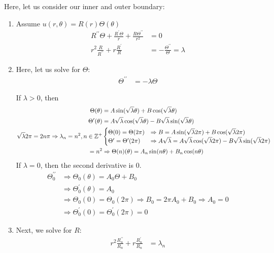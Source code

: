 Here, let us consider our inner and outer boundary:
%
\begin{enumerate}
  \item Assume $u(r, \theta) = R(r)\Theta(\theta)$
  \begin{align}
    R^{\prime\prime} \Theta + \frac{R^\prime \Theta}{r} + \frac{R\Theta^{\prime\prime}}{r^2} & = 0\\
    r^2 \frac{R}{R^{\prime\prime}} + r \frac{R^\prime}{R} & = - \frac{\Theta^{\prime\prime}}{\Theta} = \lambda
  \end{align}
  \item Here, let us solve for $\Theta$:
  \begin{align}
    \Theta^{\prime\prime} & = - \lambda \Theta
  \end{align}

  If $\lambda > 0$, then
  \begin{align}
    \Theta(\theta) & =
    A \sin(\sqrt \lambda \theta) + B \cos(\sqrt \lambda \theta)\\
    \Theta^\prime(\theta) & =
    A \sqrt \lambda \cos ( \sqrt \lambda \theta) - B \sqrt \lambda \sin (\sqrt \lambda \theta)\\
    \sqrt \lambda 2 \pi = 2 n \pi \Rightarrow \lambda_n = n^2, n \in \mathbb Z^+ &
    \begin{cases}
      \Theta(0) = \Theta(2\pi) & \Rightarrow
      B = A \sin(\sqrt \lambda 2 \pi) + B \cos(\sqrt \lambda 2 \pi)\\
      \Theta^\prime = \Theta^\prime(2 \pi) & \Rightarrow
      A \sqrt \lambda = A \sqrt \lambda \cos (\sqrt \lambda 2 \pi) - B \sqrt \lambda \sin (\sqrt \lambda 2 \pi)
    \end{cases}\\
    = n^2 & \Rightarrow
    \Theta(n)(\theta) = A_n \sin(n \theta) + B_n \cos(n \theta)
  \end{align}
  If $\lambda = 0$, then the second derivative is $0$.
  \begin{align}
    \Theta^{\prime\prime}_0 & \Rightarrow
    \Theta_0(\theta) = A_0\Theta + B_0\\
    & \Rightarrow \Theta^\prime_0 (\theta) = A_0\\
    & \Rightarrow \Theta_0(0) = \Theta_0(2 \pi) \Rightarrow B_0 = 2 \pi A_0 + B_0 \Rightarrow A_0 = 0\\
    & \Rightarrow \Theta^\prime_0(0) = \Theta^\prime_0 (2 \pi) = 0
  \end{align}
  \item Next, we solve for $R$:
  \begin{align}
    r^2 \frac{R^{\prime\prime}_n}{R_n} + r\frac{R^\prime_n}{R_n} & = \lambda_n
  \end{align}


\end{enumerate}
